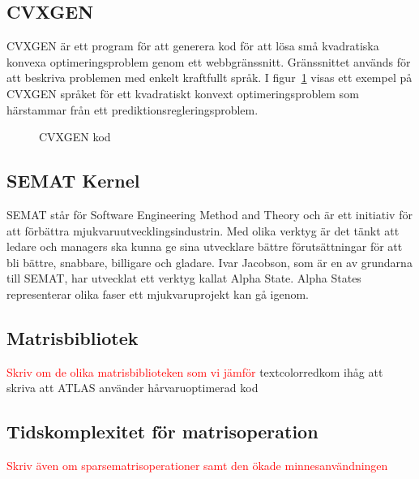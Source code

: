 \subsection{CVXGEN}
CVXGEN är ett program för att generera kod för att lösa små kvadratiska konvexa optimeringsproblem genom ett webbgränssnitt. Gränssnittet används för att beskriva problemen med enkelt kraftfullt språk. \citep{cvxgen} \newline
\newline
I figur~\ref{fig:cvxgen} visas ett exempel på CVXGEN språket för ett kvadratiskt konvext optimeringsproblem som härstammar från ett prediktionsregleringsproblem.   

\begin{figure}[H]

\caption{CVXGEN kod \citep{cvxgen2}}
\label{fig:cvxgen}
\end{figure}  

\subsection{SEMAT Kernel}
SEMAT står för Software Engineering Method and Theory och är ett initiativ för att förbättra mjukvaruutvecklingsindustrin. Med olika verktyg är det tänkt att ledare och managers ska kunna ge sina utvecklare bättre förutsättningar för att bli bättre, snabbare, billigare och gladare. \citep{semat} 
\newline
\newline
Ivar Jacobson, som är en av grundarna till SEMAT, har utvecklat ett verktyg kallat Alpha State. Alpha States representerar olika faser ett mjukvaruprojekt kan gå igenom. \citep{alphastate}

\subsection{Matrisbibliotek}
\textcolor{red}{Skriv om de olika matrisbiblioteken som vi jämför}
textcolor{red}{kom ihåg att skriva att ATLAS använder hårvaruoptimerad kod}

\subsection{Tidskomplexitet för matrisoperation}
\textcolor{red}{Skriv även om sparsematrisoperationer samt den ökade minnesanvändningen}
